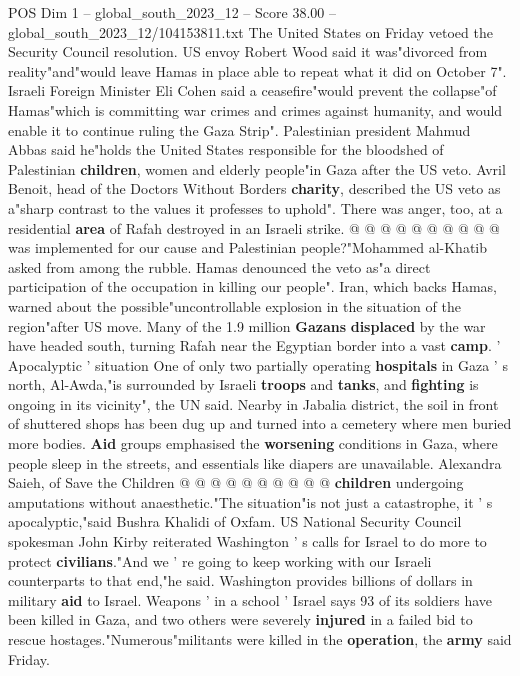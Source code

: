 \begin{textsample}{POS Dim 1 – global\_south\_2023\_12 – Score 38.00 – global\_south\_2023\_12/104153811.txt}
The United States on Friday vetoed the Security Council resolution.
US envoy Robert Wood said it was"divorced from reality"and"would leave Hamas in place able to repeat what it did on October 7".
Israeli Foreign Minister Eli Cohen said a ceasefire"would prevent the collapse"of Hamas"which is committing war crimes and crimes against humanity, and would enable it to continue ruling the Gaza Strip".
Palestinian president Mahmud Abbas said he"holds the United States responsible for the bloodshed of Palestinian \textbf{children}, women and elderly people"in Gaza after the US veto.
Avril Benoit, head of the Doctors Without Borders \textbf{charity}, described the US veto as a"sharp contrast to the values it professes to uphold".
There was anger, too, at a residential \textbf{area} of Rafah destroyed in an Israeli strike. @ @ @ @ @ @ @ @ @ @ was implemented for our cause and Palestinian people?"Mohammed al-Khatib asked from among the rubble.
Hamas denounced the veto as"a direct participation of the occupation in killing our people".
Iran, which backs Hamas, warned about the possible"uncontrollable explosion in the situation of the region"after US move.
Many of the 1.9 million \textbf{Gazans} \textbf{displaced} by the war have headed south, turning Rafah near the Egyptian border into a vast \textbf{camp}. ' Apocalyptic ' situation One of only two partially operating \textbf{hospitals} in Gaza ' s north, Al-Awda,"is surrounded by Israeli \textbf{troops} and \textbf{tanks}, and \textbf{fighting} is ongoing in its vicinity", the UN said.
Nearby in Jabalia district, the soil in front of shuttered shops has been dug up and turned into a cemetery where men buried more bodies. \textbf{Aid} groups emphasised the \textbf{worsening} conditions in Gaza, where people sleep in the streets, and essentials like diapers are unavailable.
Alexandra Saieh, of Save the Children @ @ @ @ @ @ @ @ @ @ \textbf{children} undergoing amputations without anaesthetic."The situation"is not just a catastrophe, it ' s apocalyptic,"said Bushra Khalidi of Oxfam.
US National Security Council spokesman John Kirby reiterated Washington ' s calls for Israel to do more to protect \textbf{civilians}."And we ' re going to keep working with our Israeli counterparts to that end,"he said.
Washington provides billions of dollars in military \textbf{aid} to Israel.
Weapons ' in a school ' Israel says 93 of its soldiers have been killed in Gaza, and two others were severely \textbf{injured} in a failed bid to rescue hostages."Numerous"militants were killed in the \textbf{operation}, the \textbf{army} said Friday.

\end{textsample}
